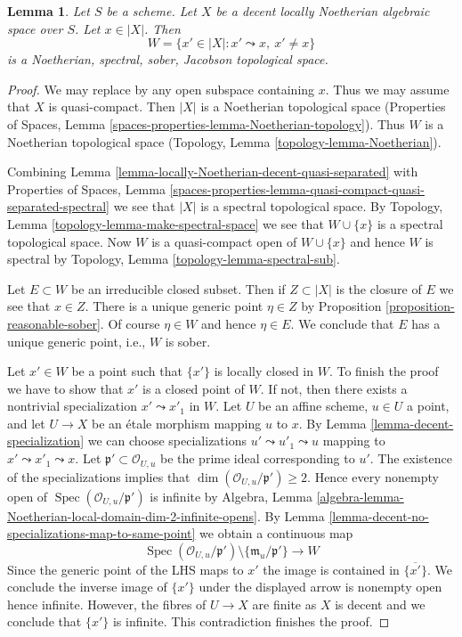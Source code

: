 \documentclass{stacks-project}
\theoremstyle{plain}
\newtheorem{lemma}[subsection]{Lemma}
\theoremstyle{definition}
\theoremstyle{remark}
\numberwithin{equation}{subsection}
\def\Spec{\mathop{\mathrm{Spec}}}
\begin{document}
\begin{lemma}
\label{lemma-punctured-spec}
Let $S$ be a scheme. Let $X$ be a decent locally Noetherian algebraic
space over $S$. Let $x \in |X|$. Then
$$
W = \{x' \in |X| : x' \leadsto x,\ x' \not = x\}
$$
is a Noetherian, spectral, sober, Jacobson topological space.
\end{lemma}

\begin{proof}
We may replace by any open subspace containing $x$.
Thus we may assume that $X$ is quasi-compact.
Then $|X|$ is a Noetherian topological space
(Properties of Spaces, Lemma \ref{spaces-properties-lemma-Noetherian-topology}).
Thus $W$ is a Noetherian topological space
(Topology, Lemma \ref{topology-lemma-Noetherian}).

\medskip\noindent
Combining Lemma \ref{lemma-locally-Noetherian-decent-quasi-separated} with
Properties of Spaces, Lemma
\ref{spaces-properties-lemma-quasi-compact-quasi-separated-spectral}
we see that $|X|$ is a spectral topological space.
By Topology, Lemma \ref{topology-lemma-make-spectral-space}
we see that $W \cup \{x\}$ is a spectral topological space.
Now $W$ is a quasi-compact open of $W \cup \{x\}$ and hence $W$ is
spectral by Topology, Lemma \ref{topology-lemma-spectral-sub}.

\medskip\noindent
Let $E \subset W$ be an irreducible closed subset. Then if $Z \subset |X|$
is the closure of $E$ we see that $x \in Z$. There is a unique generic
point $\eta \in Z$ by Proposition \ref{proposition-reasonable-sober}.
Of course $\eta \in W$ and hence $\eta \in E$. We conclude that $E$
has a unique generic point, i.e., $W$ is sober.

\medskip\noindent
Let $x' \in W$ be a point such that $\{x'\}$ is locally closed in $W$.
To finish the proof we have to show that $x'$ is a closed point of $W$.
If not, then there exists a nontrivial specialization $x' \leadsto x'_1$
in $W$. Let $U$ be an affine scheme, $u \in U$ a point, and let $U \to X$
be an \'etale morphism mapping $u$ to $x$. By
Lemma \ref{lemma-decent-specialization}
we can choose specializations $u' \leadsto u'_1 \leadsto u$
mapping to $x' \leadsto x'_1 \leadsto x$.
Let $\mathfrak p' \subset \mathcal{O}_{U, u}$ be the prime ideal
corresponding to $u'$. The existence of the specializations
implies that $\dim(\mathcal{O}_{U, u}/\mathfrak p') \geq 2$.
Hence every nonempty open of $\Spec(\mathcal{O}_{U, u}/\mathfrak p')$
is infinite by Algebra, Lemma
\ref{algebra-lemma-Noetherian-local-domain-dim-2-infinite-opens}.
By Lemma \ref{lemma-decent-no-specializations-map-to-same-point}
we obtain a continuous map
$$
\Spec(\mathcal{O}_{U, u}/\mathfrak p')
\setminus \{\mathfrak m_u/\mathfrak p'\}
\longrightarrow
W
$$
Since the generic point of the LHS maps to $x'$ the image is
contained in $\overline{\{x'\}}$. We conclude the inverse image of $\{x'\}$
under the displayed arrow is nonempty open hence infinite.
However, the fibres of $U \to X$ are finite as $X$
is decent and we conclude that $\{x'\}$ is infinite.
This contradiction finishes the proof.
\end{proof}
\end{document}
